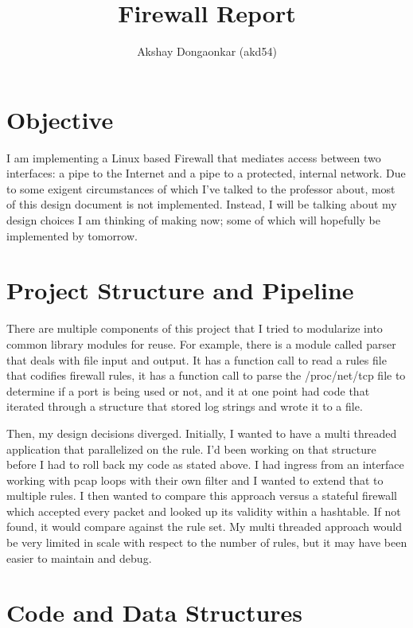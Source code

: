 \documentclass[12pt]{article}
\begin{document}
\title{Firewall Report}
\author{Akshay Dongaonkar (akd54)}
\maketitle

\section{Objective}

I am implementing a Linux based Firewall that mediates access between
two interfaces: a pipe to the Internet and a pipe to a protected, internal
network. Due to some exigent circumstances of which I've talked to the 
professor about, most of this design document is not implemented. Instead,
I will be talking about my design choices I am thinking of making now;
some of which will hopefully be implemented by tomorrow.

\section{Project Structure and Pipeline}

There are multiple components of this project that I tried to modularize 
into common library modules for reuse. For example, there is a module 
called parser that deals with file input and output. It has a function call
to read a rules file that codifies firewall rules, it has a function call 
to parse the /proc/net/tcp file to determine if a port is being used or not, 
and it at one point had code that iterated through a structure that stored 
log strings and wrote it to a file. \par

Then, my design decisions diverged. Initially, I wanted to have a 
multi threaded application that parallelized on the rule. I'd been working 
on that structure before I had to roll back my code as stated above. I had
ingress from an interface working with pcap loops with their own filter and
I wanted to extend that to multiple rules. I then wanted to compare this 
approach versus a stateful firewall which accepted every packet and 
looked up its validity within a hashtable. If not found, it would compare
against the rule set. My multi threaded approach would be very limited in
scale with respect to the number of rules, but it may have been easier to 
maintain and debug.

\section{Code and Data Structures}
\end{document}
